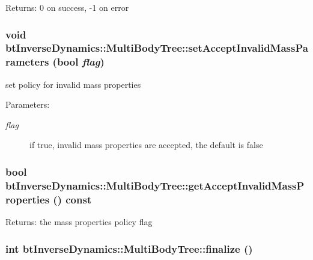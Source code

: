 \begin{Desc}
\item[Returns:]0 on success, -1 on error \end{Desc}
\hypertarget{classbt_inverse_dynamics_1_1_multi_body_tree_5ba35645225ad53584dcd0908d26c8ea}{
\subsubsection[setAcceptInvalidMassParameters]{\setlength{\rightskip}{0pt plus 5cm}void btInverseDynamics::MultiBodyTree::setAcceptInvalidMassParameters (bool {\em flag})}}
\label{classbt_inverse_dynamics_1_1_multi_body_tree_5ba35645225ad53584dcd0908d26c8ea}


set policy for invalid mass properties \begin{Desc}
\item[Parameters:]
\begin{description}
\item[{\em flag}]if true, invalid mass properties are accepted, the default is false \end{description}
\end{Desc}
\hypertarget{classbt_inverse_dynamics_1_1_multi_body_tree_ea23f21f50889b30dbf41ad57957dcee}{
\subsubsection[getAcceptInvalidMassProperties]{\setlength{\rightskip}{0pt plus 5cm}bool btInverseDynamics::MultiBodyTree::getAcceptInvalidMassProperties () const}}
\label{classbt_inverse_dynamics_1_1_multi_body_tree_ea23f21f50889b30dbf41ad57957dcee}


\begin{Desc}
\item[Returns:]the mass properties policy flag \end{Desc}
\hypertarget{classbt_inverse_dynamics_1_1_multi_body_tree_c82772ed5bebb1edd6513c03ebd719c2}{
\subsubsection[finalize]{\setlength{\rightskip}{0pt plus 5cm}int btInverseDynamics::MultiBodyTree::finalize ()}}
\label{classbt_inverse_dynamics_1_1_multi_body_tree_c82772ed5bebb1edd6513c03ebd719c2}


